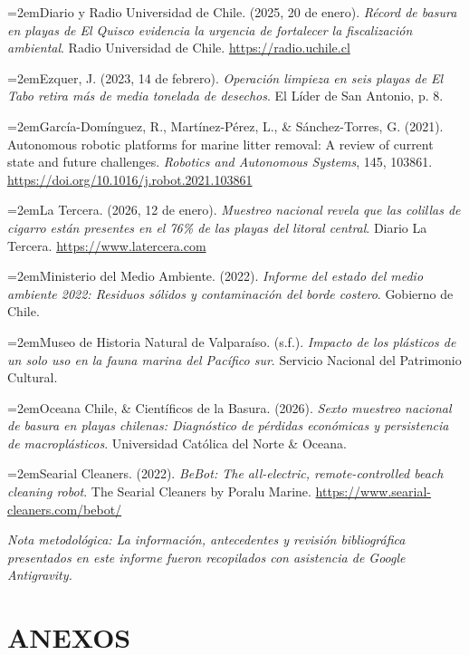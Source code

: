\documentclass[12pt,letterpaper]{article}
\newcommand{\hangapa}{\par\noindent\hangindent=2em\hangafter=1}
\begin{document}
\hangapa Diario y Radio Universidad de Chile. (2025, 20 de enero). \textit{Récord de basura en playas de El Quisco evidencia la urgencia de fortalecer la fiscalización ambiental}. Radio Universidad de Chile. \url{https://radio.uchile.cl}

\hangapa Ezquer, J. (2023, 14 de febrero). \textit{Operación limpieza en seis playas de El Tabo retira más de media tonelada de desechos}. El Líder de San Antonio, p. 8.

\hangapa García-Domínguez, R., Martínez-Pérez, L., \& Sánchez-Torres, G. (2021). Autonomous robotic platforms for marine litter removal: A review of current state and future challenges. \textit{Robotics and Autonomous Systems}, 145, 103861. \url{https://doi.org/10.1016/j.robot.2021.103861}

\hangapa La Tercera. (2026, 12 de enero). \textit{Muestreo nacional revela que las colillas de cigarro están presentes en el 76\% de las playas del litoral central}. Diario La Tercera. \url{https://www.latercera.com}

\hangapa Ministerio del Medio Ambiente. (2022). \textit{Informe del estado del medio ambiente 2022: Residuos sólidos y contaminación del borde costero}. Gobierno de Chile.

\hangapa Museo de Historia Natural de Valparaíso. (s.f.). \textit{Impacto de los plásticos de un solo uso en la fauna marina del Pacífico sur}. Servicio Nacional del Patrimonio Cultural.

\hangapa Oceana Chile, \& Científicos de la Basura. (2026). \textit{Sexto muestreo nacional de basura en playas chilenas: Diagnóstico de pérdidas económicas y persistencia de macroplásticos}. Universidad Católica del Norte \& Oceana.

\hangapa Searial Cleaners. (2022). \textit{BeBot: The all-electric, remote-controlled beach cleaning robot}. The Searial Cleaners by Poralu Marine. \url{https://www.searial-cleaners.com/bebot/}

\vspace{0.8cm}
\noindent\textit{\footnotesize *Nota metodológica: La información, antecedentes y revisión bibliográfica presentados en este informe fueron recopilados con asistencia de Google Antigravity.}

\clearpage

\appendix
\section*{ANEXOS}
\end{document}

